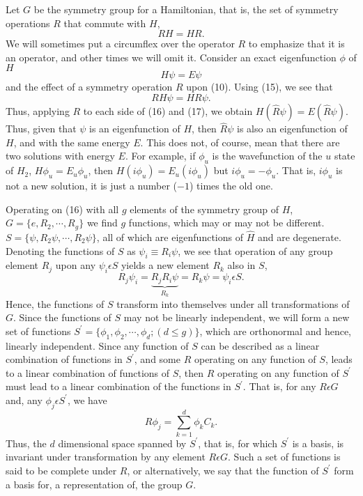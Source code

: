 Let $G$ be the symmetry group for a Hamiltonian, that is, the set of 
symmetry operations $R$ that commute with $H$,
\begin{equation}
RH = HR.
\label{chap16-eqno15}
\end{equation}
We will sometimes put a circumflex over the operator $R$ to emphasize 
that it is an operator, and other times we will omit it.  Consider an 
exact eigenfunction $\phi$ of $H$
\begin{equation}
H \psi = E \psi
\label{chap16-eqno16}
\end{equation}
and the effect of a symmetry operation $R$ upon (10).  Using (15), we 
see that
\begin{equation}
RH \psi = HR \psi.
\label{chap16-eqno17}
\end{equation}
Thus, applying $R$ to each side of (16) and (17), we obtain 
$H({\hat{R}} \psi) = E({\hat{R}}\psi)$.  Thus, given that $\psi$ is 
an eigenfunction of $H$, then ${\hat{R}}\psi$ is also an eigenfunction 
of $H$, and with the same energy $E$.  This does not, of course, mean 
that there are two solutions with energy $E$.  For example, if 
$\phi_u$ is the wavefunction of the $u$ state of $H_2$, $H \phi_u = 
E_u \phi_u$, then $H(i\phi_u)=E_u(i\phi_u)$ but $i \phi_u = - 
\phi_u$.  That is, $i \phi_u$ is not a new solution, it is just a 
number ($-1$) times the old one.

Operating on (16) with all $g$ elements of the symmetry group of $H$, 
$G = \{e, R_2, \cdots , R_g\}$ we find $g$ functions, which may or may 
not be different.  $S = \{ \psi , R_2 \psi , \cdots , R_2 \psi\}$, all 
of which are eigenfunctions of ${\hat{H}}$ and are degenerate.  
Denoting the functions of $S$ as $\psi_i \equiv R_i\psi$, we see that 
operation of any group element $R_j$ upon any $\psi_i \epsilon S$ 
yields a new element $R_k$ also in $S$,
\begin{equation}
R_j \psi_i = \underbrace{R_jR_i\psi}_{R_k} = R_k \psi = \psi_i 
\epsilon S.
\end{equation}
Hence, the functions of $S$ transform into themselves under all 
transformations of $G$.  Since the functions of $S$ may not be 
linearly independent, we will form a new set of functions 
$S^{\prime}=\{ \phi_1 , \phi_2 , \cdots , \phi_d;(d \leq g)\}$, which 
are orthonormal and hence, linearly independent.  Since any function 
of $S$ can be described as a linear combination of functions in 
$S^{\prime}$, and some $R$ operating on any function of $S$, leads to 
a linear combination of functions of $S$, then $R$ operating on any 
function of $S^{\prime}$ must lead to a linear combination of the 
functions in $S^{\prime}$.  That is, for any $R \epsilon G$ and, any 
$\phi_j\epsilon S^{\prime}$, we have
\begin{equation}
R\phi_j = \sum^{d}_{k=1} \phi_k C_k.
\label{chap16-eqno18}
\end{equation}
Thus, the $d$ dimensional space spanned by $S^{\prime}$, that is, for 
which $S^{\prime}$ is a basis, is invariant under transformation by 
any element $R \epsilon G$.  Such a set of functions is said to be 
complete under $R$, or alternatively, we say that the function of $S^{\prime}$ 
form a basis for, a representation of, the group $G$.


